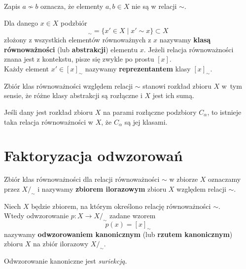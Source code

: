 	Zapis $a \not \sim b$ oznacza, że elementy $a,b \in X$ nie są w relacji $\sim$.
	\begin{df}
	Dla danego $x \in X$ podzbiór
	\begin{equation}
	[x]_{\sim}  = \{ x' \in X \; | \; x' \sim x \} \subset X
	\end{equation}
	złożony z wszystkich elementów równoważnych z $x$ nazywamy \textbf{klasą równoważności} (lub \textbf{abstrakcji}) elementu $x$. Jeżeli relacja równoważności znana jest z kontekstu, pisze się zwykle po prostu $[x]$. \\
	Każdy element $x' \in [x]_{\sim}$ nazywamy \textbf{reprezentantem} klasy $[x]_{\sim}$.
	\end{df}
	
	\begin{stw}
	Zbiór klas równoważności względem relacji $\sim$ stanowi rozkład zbioru $X$ w~tym sensie, że różne klasy abstrakcji są rozłączne  i $X$ jest ich sumą.
	\end{stw}
	
	\begin{stw}
		Jeśli dany jest rozkład zbioru $X$ na parami rozłączne podzbiory $C_{\alpha}$, to istnieje taka relacja równoważności w $X$, że $C_{\alpha}$ są jej klasami.
	\end{stw}
	
	\section{Faktoryzacja odwzorowań}
	\begin{df}
		Zbiór klas równoważności dla relacji równoważności $\sim$ w zbiorze $X$ oznaczamy przez $X/_{\sim}$ i nazywamy \textbf{zbiorem ilorazowym} zbioru $X$ względem relacji $\sim$.
	\end{df}
	
	\begin{df}Niech $X$ będzie zbiorem, na którym określono relację równoważności $\sim$. \\Wtedy odwzorowanie $p: X \rightarrow X/_{\sim}$ zadane wzorem
		 \begin{equation}\label{rzut_kanoniczny}
		 p(x) = [x]_{\sim}
		 \end{equation}
		 nazywamy \textbf{odwzorowaniem kanonicznym} (lub \textbf{rzutem kanonicznym}) zbioru $X$ na zbiór ilorazowy $X/_{\sim}$.
	\end{df}
	\begin{uwg}
		Odwzorowanie kanoniczne jest \textit{suriekcją}.
	\end{uwg}
	
